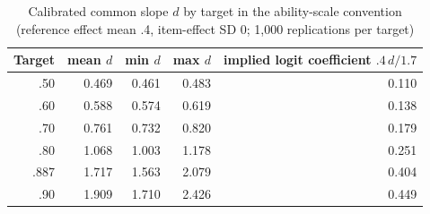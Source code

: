 \begin{table}[ht]
\centering
\caption{Calibrated common slope $d$ by target in the ability-scale convention (reference effect mean .4, item-effect SD 0; 1,000 replications per target)}
\label{tab:app-slope}
\small
\begin{tabular}{rrrrr}
\toprule
Target & mean $d$ & min $d$ & max $d$ & implied logit coefficient $.4\,d/1.7$ \\
\midrule
.50 & 0.469 & 0.461 & 0.483 & 0.110 \\
.60 & 0.588 & 0.574 & 0.619 & 0.138 \\
.70 & 0.761 & 0.732 & 0.820 & 0.179 \\
.80 & 1.068 & 1.003 & 1.178 & 0.251 \\
.887 & 1.717 & 1.563 & 2.079 & 0.404 \\
.90 & 1.909 & 1.710 & 2.426 & 0.449 \\
\bottomrule
\end{tabular}
\end{table}
